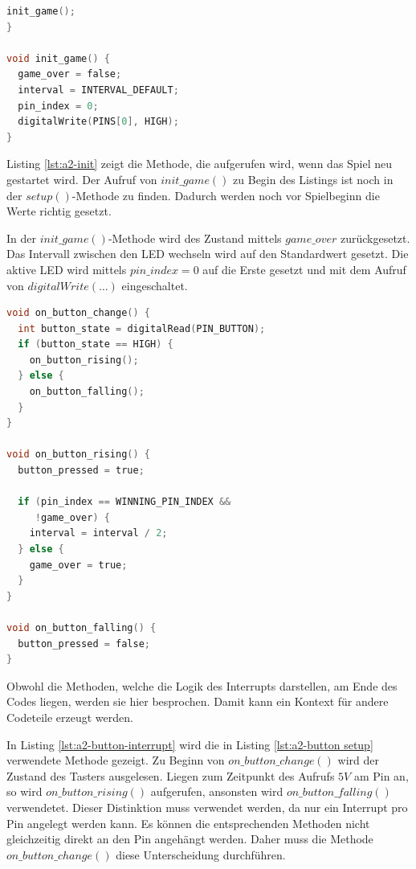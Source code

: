 \begin{lstlisting}[language=C,label={lst:a2-init}, caption={Setzen der Standardwerte}]
  init_game();
}

void init_game() {
  game_over = false;
  interval = INTERVAL_DEFAULT;
  pin_index = 0;
  digitalWrite(PINS[0], HIGH);
}
\end{lstlisting}

Listing \ref{lst:a2-init} zeigt die Methode, die aufgerufen wird, wenn das Spiel neu gestartet wird.
Der Aufruf von $init\_game()$ zu Begin des Listings ist noch in der $setup()$-Methode zu finden.
Dadurch werden noch vor Spielbeginn die Werte richtig gesetzt.

In der $init\_game()$-Methode wird des Zustand mittels $game\_over$ zurückgesetzt.
Das Intervall zwischen den LED wechseln wird auf den Standardwert gesetzt.
Die aktive LED wird mittels $pin\_index = 0$ auf die Erste gesetzt und mit dem Aufruf von $digitalWrite(\dots)$ eingeschaltet.

\begin{lstlisting}[language=C,label={lst:a2-button-interrupt}, caption={Interrupt Methoden des Tasters}]
void on_button_change() {
  int button_state = digitalRead(PIN_BUTTON);
  if (button_state == HIGH) {
   	on_button_rising();
  } else {
    on_button_falling();
  }
}

void on_button_rising() {
  button_pressed = true;

  if (pin_index == WINNING_PIN_INDEX &&
     !game_over) {
    interval = interval / 2;
  } else {
    game_over = true;
  }
}

void on_button_falling() {
  button_pressed = false;
}
\end{lstlisting}

Obwohl die Methoden, welche die Logik des Interrupts darstellen, am Ende des Codes liegen, werden sie hier besprochen.
Damit kann ein Kontext für andere Codeteile erzeugt werden.

\newpage

In Listing \ref{lst:a2-button-interrupt} wird die in Listing \ref{lst:a2-button setup} verwendete Methode gezeigt.
Zu Beginn von $on\_button\_change()$ wird der Zustand des Tasters ausgelesen.
Liegen zum Zeitpunkt des Aufrufs $5V$ am Pin an, so wird $on\_button\_rising()$ aufgerufen, ansonsten wird $on\_button\_falling()$ verwendetet.
Dieser Distinktion muss verwendet werden, da nur ein Interrupt pro Pin angelegt werden kann.
Es können die entsprechenden Methoden nicht gleichzeitig direkt an den Pin angehängt werden.
Daher muss die Methode $on\_button\_change()$ diese Unterscheidung durchführen.


